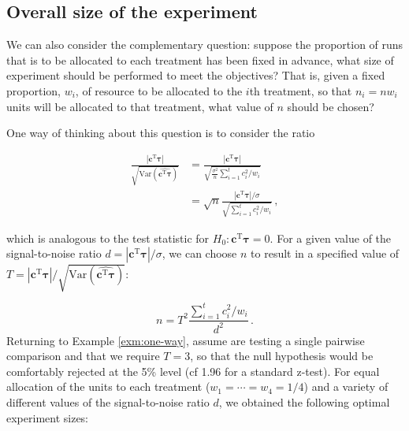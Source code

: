 \documentclass[
]{book}
\theoremstyle{definition}
\theoremstyle{definition}
\theoremstyle{definition}
\theoremstyle{definition}
\theoremstyle{remark}
\begin{document}
\hypertarget{crd-size}{%
\subsection{Overall size of the experiment}\label{crd-size}}

We can also consider the complementary question: suppose the proportion of runs that is to be allocated to each treatment has been fixed in advance, what size of experiment should be performed to meet the objectives? That is, given a fixed proportion, \(w_i\), of resource to be allocated to the \(i\)th treatment, so that \(n_i = nw_i\) units will be allocated to that treatment, what value of \(n\) should be chosen?

One way of thinking about this question is to consider the ratio

\begin{align*}
\frac{|\boldsymbol{c}^{\mathrm{T}}\boldsymbol{\tau}|}{\sqrt{\mbox{Var}(\widehat{\boldsymbol{c}^{\mathrm{T}}\boldsymbol{\tau}})}} & = \frac{|\boldsymbol{c}^{\mathrm{T}}\boldsymbol{\tau}|}{\sqrt{\frac{\sigma^2}{n} \sum_{i=1}^tc_i^2/w_i}} \\
& = \sqrt{n}\frac{|\boldsymbol{c}^{\mathrm{T}}\boldsymbol{\tau}| / \sigma}{\sqrt{\sum_{i=1}^tc_i^2/w_i}}\,,
\end{align*}

which is analogous to the test statistic for \(H_0: \boldsymbol{c}^{\mathrm{T}}\boldsymbol{\tau} = 0\). For a given value of the signal-to-noise ratio \(d = |\boldsymbol{c}^{\mathrm{T}}\boldsymbol{\tau}| / \sigma\), we can choose \(n\) to result in a specified value of \(T = |\boldsymbol{c}^{\mathrm{T}}\boldsymbol{\tau}| / \sqrt{\mbox{Var}(\widehat{\boldsymbol{c}^{\mathrm{T}}\boldsymbol{\tau}})}\):

\[
n = T^2\frac{\sum_{i=1}^t c_i^2/w_i}{d^2}\,.
\]
Returning to Example \ref{exm:one-way}, assume are testing a single pairwise comparison and that we require \(T = 3\), so that the null hypothesis would be comfortably rejected at the 5\% level (cf 1.96 for a standard z-test). For equal allocation of the units to each treatment (\(w_1 = \cdots = w_4 = 1/4\)) and a variety of different values of the signal-to-noise ratio \(d\), we obtained the following optimal experiment sizes:
\end{document}
